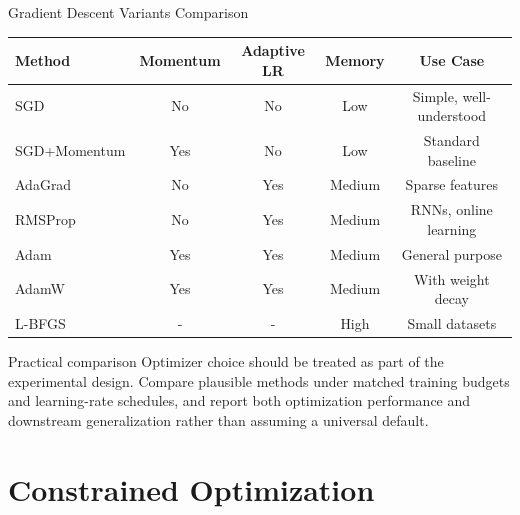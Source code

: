 \documentclass[aspectratio=169]{beamer}
\begin{document}
\begin{frame}[fragile]{Gradient Descent Variants Comparison}
  \begin{table}
    \centering
    \small
    \begin{tabular}{lcccc}
      \toprule
      Method & Momentum & Adaptive LR & Memory & Use Case \\
      \midrule
      SGD & No & No & Low & Simple, well-understood \\
      SGD+Momentum & Yes & No & Low & Standard baseline \\
      AdaGrad & No & Yes & Medium & Sparse features \\
      RMSProp & No & Yes & Medium & RNNs, online learning \\
      Adam & Yes & Yes & Medium & General purpose \\
      AdamW & Yes & Yes & Medium & With weight decay \\
      L-BFGS & - & - & High & Small datasets \\
      \bottomrule
    \end{tabular}
  \end{table}

  \vspace{0.5em}

  \begin{alertbox}{Practical comparison}
    Optimizer choice should be treated as part of the experimental design. Compare plausible methods under matched training budgets and learning-rate schedules, and report both optimization performance and downstream generalization rather than assuming a universal default.
  \end{alertbox}
\end{frame}

\section{Constrained Optimization}
\end{document}
